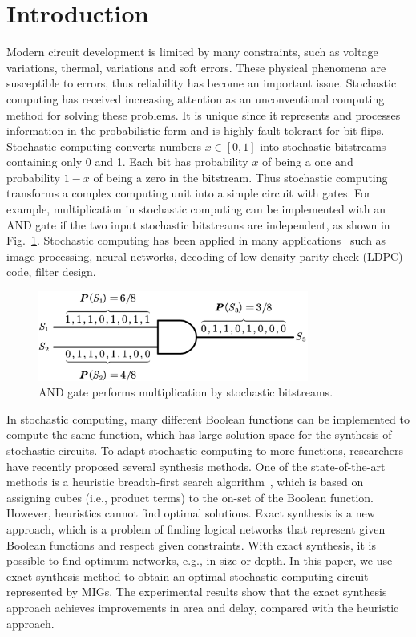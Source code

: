 \documentclass[conference,letterpaper]{IEEEtran}
\begin{document}
\section*{Introduction}
Modern circuit development is limited by many constraints, such as voltage variations, thermal, variations and soft errors. These physical phenomena are susceptible to errors, thus reliability has become an important issue. Stochastic computing has received increasing attention as an unconventional computing method for solving these problems. It is unique since it represents and processes information in the probabilistic form and is highly fault-tolerant for bit flips. Stochastic computing converts numbers $x\in[0,1]$ into stochastic bitstreams containing only 0 and 1. 
Each bit has probability $x$ of being a one and probability $1-x$ of being a zero in the bitstream. Thus stochastic computing transforms a complex computing unit into a simple circuit with gates. For example, multiplication in stochastic computing can be implemented with an AND gate if the two input stochastic bitstreams are independent, as shown in Fig.~\ref{fig:sto}.  
Stochastic computing has been applied in many applications~\cite{1} such as image processing, neural networks, decoding of low-density parity-check (LDPC) code, filter design.

\begin{figure}[t]
	\centering
	\includegraphics[width=3.5in]{fig/AND3.pdf}	\vspace{-3ex}
	\caption{\label{fig:sto}AND gate performs multiplication by stochastic bitstreams.} \vspace{-2ex}
\end{figure}

In stochastic computing, many different Boolean functions can be implemented to compute the same function, which has large solution space for the synthesis of stochastic circuits. To adapt stochastic computing to more functions, researchers have recently proposed several synthesis methods. One of the state-of-the-art methods is a heuristic breadth-first search algorithm~\cite{2}, which is based on assigning
cubes (i.e., product terms) to the on-set of the Boolean function. However, heuristics cannot find optimal solutions. Exact synthesis is a new approach, which is a problem of finding logical networks that represent given Boolean functions and respect given constraints. With exact synthesis, it is possible to find optimum networks, e.g., in size or depth. In this paper, we use exact synthesis method to obtain an optimal stochastic computing circuit represented by MIGs. The experimental results show that the exact synthesis approach achieves improvements in area and delay, compared with the heuristic approach.
\end{document}
